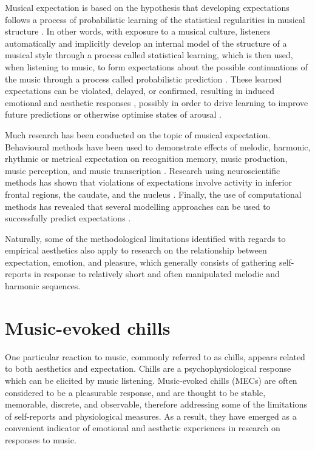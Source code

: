 Musical expectation is based on the hypothesis that developing expectations follows a process of probabilistic learning of the statistical regularities in musical structure \parencite{pearce2018, saffran1999}. In other words, with exposure to a musical culture, listeners automatically and implicitly develop an internal model of the structure of a musical style through a process called statistical learning, which is then used, when listening to music, to form expectations about the possible continuations of the music through a process called probabilistic prediction \parencite{pearce2018}. These learned expectations can be violated, delayed, or confirmed, resulting in induced emotional and aesthetic responses \parencite{cheung2019, egermann2013, gold2019, huron2006, juslin2013, sauve2018, steinbeis2006}, possibly in order to drive learning to improve future predictions or otherwise optimise states of arousal \parencite{pearce2018}. 

Much research has been conducted on the topic of musical expectation. Behavioural methods have been used to demonstrate effects of melodic, harmonic, rhythmic or metrical expectation on recognition memory, music production, music perception, and music transcription \parencite[for a review, see][]{pearce2012}. Research using neuroscientific methods has shown that violations of expectations involve activity in inferior frontal regions, the caudate, and the nucleus \parencite[for reviews, see][]{salimpoor2015, trainor2016}. Finally, the use of computational methods has revealed that several modelling approaches can be used to successfully predict expectations \parencite[for a review, see][]{rohrmeier2012}. 

Naturally, some of the methodological limitations identified with regards to empirical aesthetics also apply to research on the relationship between expectation, emotion, and pleasure, which generally consists of gathering self-reports in response to relatively short \parencite{cheung2019} and often manipulated \parencite{gold2019, sauve2018, steinbeis2006} melodic and harmonic sequences.

\section{Music-evoked chills}    

One particular reaction to music, commonly referred to as chills, appears related to both aesthetics and expectation. Chills are a psychophysiological response which can be elicited by music listening. Music-evoked chills (MECs) are often considered to be a pleasurable response, and are thought to be stable, memorable, discrete, and observable, therefore addressing some of the limitations of self-reports and physiological measures. As a result, they have emerged as a convenient indicator of emotional and aesthetic experiences in research on responses to music.

